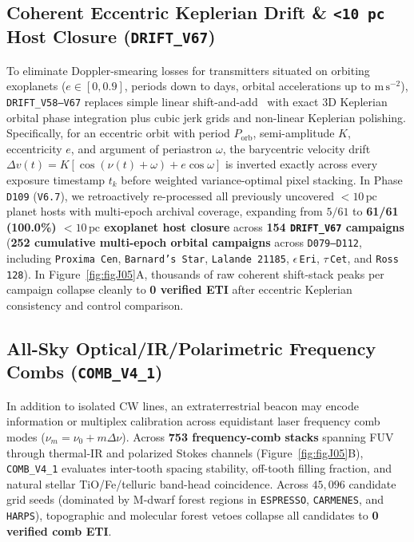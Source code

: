 \documentclass[twocolumn,10pt]{article}
\begin{document}
\subsection{Coherent Eccentric Keplerian Drift \& \texttt{<10 pc} Host Closure (\texttt{DRIFT\_V67})}
To eliminate Doppler-smearing losses for transmitters situated on orbiting exoplanets ($e \in [0, 0.9]$, periods down to days, orbital accelerations up to $\mathrm{m\,s^{-2}}$), \texttt{DRIFT\_V58--V67} replaces simple linear shift-and-add~\cite{Sheikh2020} with exact 3D Keplerian orbital phase integration plus cubic jerk grids and non-linear Keplerian polishing. Specifically, for an eccentric orbit with period $P_{\mathrm{orb}}$, semi-amplitude $K$, eccentricity $e$, and argument of periastron $\omega$, the barycentric velocity drift $\Delta v(t) = K[\cos(\nu(t)+\omega) + e\cos\omega]$ is inverted exactly across every exposure timestamp $t_k$ before weighted variance-optimal pixel stacking. In Phase \texttt{D109} (\texttt{V6.7}), we retroactively re-processed all previously uncovered $<10\,\mathrm{pc}$ planet hosts with multi-epoch archival coverage, expanding from $5/61$ to \textbf{61/61 (100.0\%) $<10\,\mathrm{pc}$ exoplanet host closure} across \textbf{154 \texttt{DRIFT\_V67} campaigns} (\textbf{252 cumulative multi-epoch orbital campaigns} across \texttt{D079--D112}, including \texttt{Proxima Cen}, \texttt{Barnard's Star}, \texttt{Lalande\,21185}, $\epsilon$\,\texttt{Eri}, $\tau$\,\texttt{Cet}, and \texttt{Ross\,128}). In Figure~\ref{fig:figJ05}A, thousands of raw coherent shift-stack peaks per campaign collapse cleanly to \textbf{0 verified ETI} after eccentric Keplerian consistency and control comparison.

\subsection{All-Sky Optical/IR/Polarimetric Frequency Combs (\texttt{COMB\_V4\_1})}
In addition to isolated CW lines, an extraterrestrial beacon may encode information or multiplex calibration across equidistant laser frequency comb modes ($\nu_m = \nu_0 + m\Delta\nu$). Across \textbf{753 frequency-comb stacks} spanning FUV through thermal-IR and polarized Stokes channels (Figure~\ref{fig:figJ05}B), \texttt{COMB\_V4\_1} evaluates inter-tooth spacing stability, off-tooth filling fraction, and natural stellar TiO/Fe/telluric band-head coincidence. Across $45{,}096$ candidate grid seeds (dominated by M-dwarf forest regions in \texttt{ESPRESSO}, \texttt{CARMENES}, and \texttt{HARPS}), topographic and molecular forest vetoes collapse all candidates to \textbf{0 verified comb ETI}.
\end{document}
